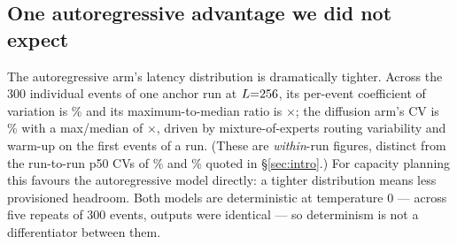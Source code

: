 \subsection{One autoregressive advantage we did not expect}
\label{sec:unexpected}

The autoregressive arm's latency distribution is dramatically tighter. Across
the 300 individual events of one anchor run at $L{=}256$, its
per-event coefficient of variation is \arEventCV\% and its maximum-to-median
ratio is \arMaxMed$\times$; the diffusion arm's CV is \dgEventCV\% with a
max/median of \dgMaxMed$\times$, driven by mixture-of-experts routing
variability and warm-up on the first events of a run. (These are
\emph{within}-run figures, distinct from the run-to-run p50 CVs of \arCV\%
and \dgCV\% quoted in \S\ref{sec:intro}.) For capacity
planning this favours the autoregressive model directly: a tighter
distribution means less provisioned headroom. Both models are deterministic at
temperature 0 --- across five repeats of 300 events, outputs were identical
--- so determinism is not a differentiator between them.
